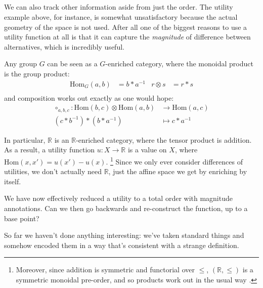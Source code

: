 \documentclass{article}
\begin{document}
	
	\subsection{}
	We can also track other information aside from just the order. The utility example above, for instance, is somewhat unsatisfactory because the actual geometry of the space is not used. After all one of the biggest reasons to use a utility function at all is that it can capture the \textit{magnitude} of difference between alternatives, which is incredibly useful.
	
	
	\begin{fact}
		Any group $G$ can be seen as a $G$-enriched category, where the monoidal product is the group product:
		\begin{align*}
			\mathrm{Hom}_{G}(a, b) &= b * a^{-1} &
			r \otimes s &= r * s \\
		\end{align*}
		and composition works out exactly as one would hope:
		\begin{align*}
		\circ_{a,b,c} : \mathrm{Hom}(b,c) \otimes \mathrm{Hom}(a,b) &\to \mathrm{Hom}(a,c)\\
		(c * b^{-1}) * (b * a^{-1}) &\mapsto c * a^{-1}
		\end{align*}
	\end{fact}
	
	\begin{example}
		In particular, $\mathbb R$ is an $\mathbb R$-enriched category, where the tensor product is addition. As a result, a utility function $u: X \to \mathbb R$ is a value on $X$, where $\mathrm{Hom}(x, x') = u(x') - u(x)$. \footnote{Moreover, since addition is symmetric and functorial over $\leq$, $(\mathbb R, \leq)$ is a symmetric monoidal pre-order, and so products work out in the usual way \cite{spivek-ex2.74}.} Since we only ever consider differences of utilities, we don't actually need $\mathbb R$, just the affine space we get by enriching by itself. 
	\end{example} 

	We have now effectively reduced a utility to a total order with magnitude annotations. Can we then go backwards and re-construct the function, up to a base point?
	
	
	So far we haven't done anything interesting: we've taken standard things and somehow encoded them in a way that's consistent with a strange definition.
	
	
	
\end{document}
